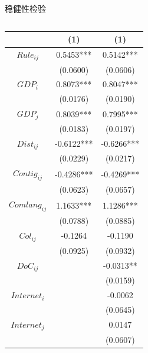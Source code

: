 \documentclass{beamer}
\begin{document}
\begin{frame}{稳健性检验}
    \vspace{-0.5cm}
    \begin{columns}[T]
        \begin{column}{0.6\textwidth}
            \tiny
            \setlength{\tabcolsep}{3pt}
            \centering
            \begin{threeparttable}
                \captionsetup{font=tiny}
                \caption{稳健性检验-重新度量数字贸易指标}
                \renewcommand{\arraystretch}{0.8} %
                \begin{tabular}{ccc}
                    \toprule
                    & \multicolumn{1}{c}{(1)} & \multicolumn{1}{c}{(1)} \\
                    \midrule
                    $Rule_{ij}$ & 0.5453*** & 0.5142*** \\
                    & (0.0600) & (0.0606) \\
                    $GDP_i$ & 0.8073*** & 0.8047*** \\
                    & (0.0176) & (0.0190) \\
                    $GDP_j$ & 0.8039*** & 0.7995*** \\
                    & (0.0183) & (0.0197) \\
                    $Dist_{ij}$ & -0.6122*** & -0.6266*** \\
                    & (0.0229) & (0.0217) \\
                    $Contig_{ij}$ & -0.4286*** & -0.4269*** \\
                    & (0.0623) & (0.0657) \\
                    $Comlang_{ij}$ & 1.1633*** & 1.1286*** \\
                    & (0.0788) & (0.0885) \\
                    $Col_{ij}$ & -0.1264 & -0.1190 \\
                    & (0.0925) & (0.0932) \\
                    $DoC_{ij}$ & & -0.0313** \\
                    & & (0.0159) \\
                    $Internet_i$ & & -0.0062 \\
                    & & (0.0645) \\
                    $Internet_j$ & & 0.0147 \\
                    & & (0.0607) \\

\end{tabular}
\end{threeparttable}
\end{column}
\end{columns}
\end{frame}
\end{document}
